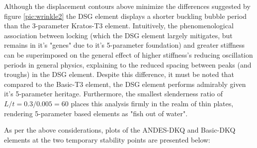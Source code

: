 Although the displacement contours above minimize the differences suggested by figure \ref{pic:wrinkle2} the DSG element displays a shorter buckling bubble period than the 3-parameter Kratos-T3 element. Intuitively, the phenomenological association between locking (which the DSG element largely mitigates, but remains in it's "genes" due to it's 5-parameter foundation) and greater stiffness can be superimposed on the general effect of higher stiffness's reducing oscillation periods in general physics, explaining to the reduced spacing between peaks (and troughs) in the DSG element. Despite this difference, it must be noted that compared to the Basic-T3 element, the DSG element performs admirably given it's 5-parameter heritage. Furthermore, the smallest slenderness ratio of $L/t = 0.3/0.005 = 60$ places this analysis firmly in the realm of thin plates, rendering 5-parameter based elements as "fish out of water".

As per the above considerations, plots of the ANDES-DKQ and Basic-DKQ elements at the two temporary stability points are presented below:

